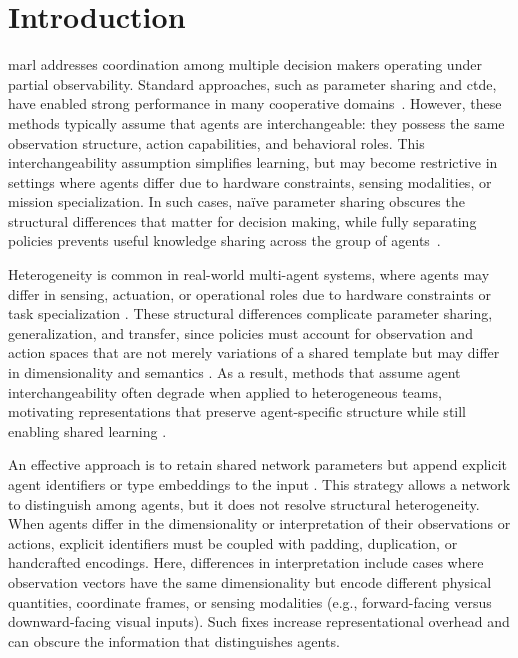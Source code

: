 \section{Introduction}

\Gls{marl} addresses coordination among multiple decision 
makers operating under partial observability.
Standard approaches, such as parameter sharing and \gls{ctde},
have enabled strong performance in many cooperative 
domains~\cite{albrecht2024, christianos2021}.
However, these methods typically assume that agents are interchangeable: 
they possess the same observation structure, action capabilities, and behavioral roles. 
This interchangeability assumption simplifies learning, 
but may become restrictive in settings where agents differ due to hardware constraints, 
sensing modalities, or mission specialization. 
In such cases, na\"{i}ve parameter sharing obscures the 
structural differences that matter for decision making, 
while fully separating policies prevents useful knowledge sharing across the 
group of agents~\cite{albrecht2024, christianos2021, terry2020, canese2021}.

Heterogeneity is common in real-world multi-agent systems, where agents may differ 
in sensing, actuation, or operational roles due to hardware constraints 
or task specialization \cite{calvo2018, cao2012}. 
These structural differences complicate parameter sharing, generalization, and transfer, 
since policies must account for observation and action spaces that are not merely 
variations of a shared template but may differ in dimensionality and semantics \cite{canese2021}. 
As a result, methods that assume agent interchangeability often degrade when applied to 
heterogeneous teams, motivating representations that preserve agent-specific structure 
while still enabling shared learning \cite{christianos2021, albrecht2024}.

An effective approach is to retain shared network parameters but append explicit agent 
identifiers or type embeddings to the input \cite{terry2020, christianos2021}. 
This strategy allows a network to distinguish among agents, 
but it does not resolve structural heterogeneity. 
When agents differ in the dimensionality or interpretation of their observations or actions,
explicit identifiers must be coupled with padding, duplication, or handcrafted encodings.
Here, differences in interpretation include cases where observation vectors have the same
dimensionality but encode different physical quantities, coordinate frames, or sensing
modalities (e.g., forward-facing versus downward-facing visual inputs).
Such fixes increase representational overhead and can obscure the information that
distinguishes agents.

